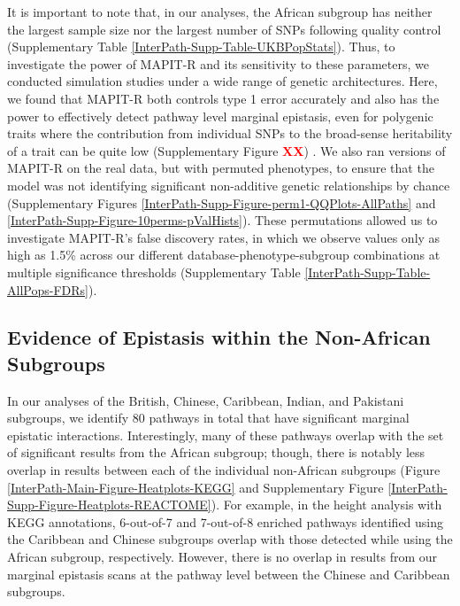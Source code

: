 \documentclass[10pt,a4paper]{article}
\begin{document}
It is important to note that, in our analyses, the African subgroup has neither the largest sample size nor the largest number of SNPs following quality control (Supplementary Table \ref{InterPath-Supp-Table-UKBPopStats}). Thus, to investigate the power of MAPIT-R and its sensitivity to these parameters, we conducted simulation studies under a wide range of genetic architectures. Here, we found that MAPIT-R both controls type 1 error accurately and also has the power to effectively detect pathway level marginal epistasis, even for polygenic traits where the contribution from individual SNPs to the broad-sense heritability of a trait can be quite low (Supplementary Figure \textcolor{red}{\textbf{XX}}) \cite{Crawford2017a}. We also ran versions of MAPIT-R on the real data, but with permuted phenotypes, to ensure that the model was not identifying significant non-additive genetic relationships by chance (Supplementary Figures \ref{InterPath-Supp-Figure-perm1-QQPlots-AllPaths} and \ref{InterPath-Supp-Figure-10perms-pValHists}). These permutations allowed us to investigate MAPIT-R's false discovery rates, in which we observe values only as high as 1.5\% across our different database-phenotype-subgroup combinations at multiple significance thresholds (Supplementary Table \ref{InterPath-Supp-Table-AllPops-FDRs}).

\subsection*{Evidence of Epistasis within the Non-African Subgroups}

In our analyses of the British, Chinese, Caribbean, Indian, and Pakistani subgroups, we identify 80 pathways in total that have significant marginal epistatic interactions. Interestingly, many of these pathways overlap with the set of significant results from the African subgroup; though, there is notably less overlap in results between each of the individual non-African subgroups (Figure \ref{InterPath-Main-Figure-Heatplots-KEGG} and Supplementary Figure \ref{InterPath-Supp-Figure-Heatplots-REACTOME}). For example, in the height analysis with KEGG annotations, 6-out-of-7 and 7-out-of-8 enriched pathways identified using the Caribbean and Chinese subgroups overlap with those detected while using the African subgroup, respectively. However, there is no overlap in results from our marginal epistasis scans at the pathway level between the Chinese and Caribbean subgroups.
\end{document}
